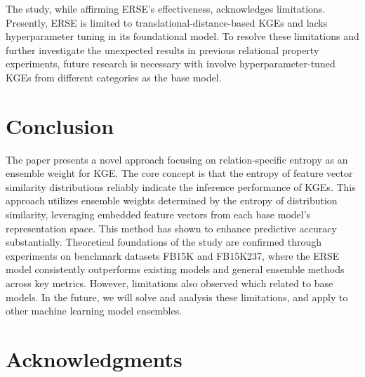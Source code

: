 \documentclass{article}
\begin{document}
The study, while affirming ERSE's effectiveness, acknowledges limitations. Presently, ERSE is limited to translational-distance-based KGEs and lacks hyperparameter tuning in its foundational model. To resolve these limitations and further investigate the unexpected results in previous relational property experiments, future research is necessary with involve hyperparameter-tuned KGEs from different categories as the base model.

\section{Conclusion}
\label{Conclusion}
The paper presents a novel approach focusing on relation-specific entropy as an ensemble weight for KGE. The core concept is that the entropy of feature vector similarity distributions reliably indicate the inference performance of KGEs. This approach utilizes ensemble weights determined by the entropy of distribution similarity, leveraging embedded feature vectors from each base model's representation space. This method has shown to enhance predictive accuracy substantially. Theoretical foundations of the study are confirmed through experiments on benchmark datasets FB15K and FB15K237, where the ERSE model consistently outperforms existing models and general ensemble methods across key metrics. However, limitations also observed which related to base models. In the future, we will solve and analysis these limitations, and apply to other machine learning model ensembles.

\section*{Acknowledgments}



\end{document}
